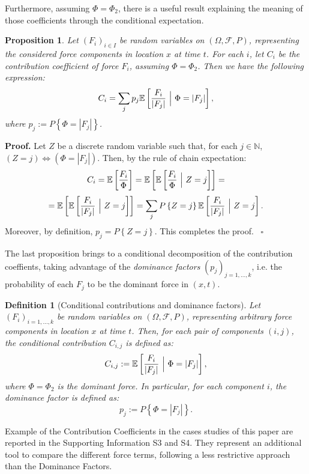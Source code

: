 \documentclass{article}
\newtheorem{definition}[theorem]{Definition}
\newtheorem{proposition}[theorem]{Proposition}
\newenvironment{proof}[1][Proof]{\noindent\textbf{#1.} }{\ $\square$}
\begin{document}
Furthermore, assuming $\Phi=\Phi_2$, there is a useful result explaining the meaning of those coefficients through the conditional expectation.
\begin{proposition}
Let $(F_i)_{i\in I}$ be random variables on $(\Omega, \mathcal F, P)$, representing the considered force components in location $x$ at time $t$. For each $i$, let $C_i$ be the contribution coefficient of force $F_i$, assuming $\Phi=\Phi_2$. Then we have the following expression:
$$C_i=\sum_j p_j \mathbb E\left[\frac{F_i}{|F_j|}\ \Big{|}\ \Phi=|F_j|\right],$$
where $p_j:=P\left\{\Phi=|F_j|\right\}$.
\end{proposition}

\begin{proof}
Let $Z$ be a discrete random variable such that, for each $j\in\mathbb N$, $(Z=j) \Longleftrightarrow (\Phi=|F_j|)$. Then, by the rule of chain expectation:
$$C_i=\mathbb E\left[\frac{F_i}{\Phi}\right]=\mathbb E\left[\mathbb E\left[\frac{F_i}{\Phi}\ \Big{|}\ Z=j\right]\right]=$$
$$=\mathbb E\left[\mathbb E\left[\frac{F_i}{|F_j|}\ \Big{|}\ Z=j\right]\right]=\sum_j P\left\{Z=j\right\} \mathbb E\left[\frac{F_i}{|F_j|}\ \Big{|}\ Z=j\right].$$
Moreover, by definition, $p_j=P\left\{Z=j\right\}$. This completes the proof.
\end{proof}

The last proposition brings to a conditional decomposition of the contribution coeffients, taking advantage of the \emph{dominance factors} $(p_j)_{j=1,\dots, k}$, i.e. the probability of each $F_j$ to be the dominant force in $(x,t)$.

\begin{definition}[Conditional contributions and dominance factors]
Let $(F_i)_{i=1,\dots, k}$ be random variables on $(\Omega, \mathcal F, P)$, representing arbitrary force components in location $x$ at time $t$. Then, for each pair of components $(i,j)$, the conditional contribution $C_{i,j}$ is defined as:
$$C_{i,j}:=\mathbb E\left[\frac{F_i}{|F_j|}\ \Big{|}\ \Phi=|F_j|\right],$$
where $\Phi=\Phi_2$ is the dominant force. In particular, for each component $i$, the dominance factor is defined as:
$$p_j:=P\left\{\Phi=|F_j|\right\}.$$
\end{definition}

Example of the Contribution Coefficients in the cases studies of this paper are reported in the Supporting Information S3 and S4. They represent an additional tool to compare the different force terms, following a less restrictive approach than the Dominance Factors.

\newpage


\end{document}
